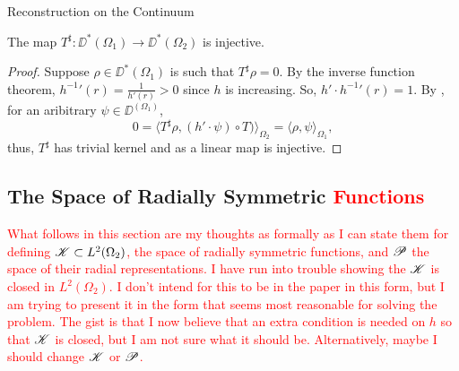 \begin{chapter}{Reconstruction on the Continuum}
\begin{cor} \label{cor:injectivity}
  The map $T^\sharp:\DD^*(\Omega_1) \to \DD^*(\Omega_2)$ is injective.
\end{cor}
\begin{proof}
  Suppose $\rho \in \DD^*(\Omega_1)$ is such that $T^\sharp \rho = 0$.
  By the inverse function theorem, ${h^{-1}}'(r) = \frac 1{h'(r)} > 0$ since $h$ is increasing.
  So, $h' \cdot {h^{-1}}' (r) = 1$.
  By , for an aribitrary $\psi\in \DD^(\Omega_1)$,
  \begin{equation}
    0 = \Big\langle T^\sharp \rho, (h' \cdot \psi) \circ T)\Big\rangle_{\Omega_2} = \Big\langle \rho, \psi\Big\rangle_{\Omega_1},
  \end{equation}
  thus, $T^\sharp$ has trivial kernel and as a linear map is injective.

\end{proof}

\subsection{The Space of Radially Symmetric \textcolor{red}{Functions}} \label{radially_symmetric_space}

\textcolor{red}{What follows in this section are my thoughts as formally as I can state them for defining $\mathscr K\subset L^2(\Omega_2)$, the space of radially symmetric functions, and $\mathscr P$ the space of their radial representations.  
I have run into trouble showing the $\mathscr K$ is closed in $L^2(\Omega_2)$.
I don't intend for this to be in the paper in this form, but I am trying to present it in the form that seems most reasonable for solving the problem.
The gist is that I now believe that an extra condition is needed on $h$ so that $\mathscr K$ is closed, but I am not sure what it should be.
Alternatively, maybe I should change $\mathscr K$ or $\mathscr P$. 
}


\end{chapter}
